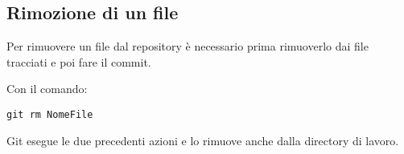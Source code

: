 \subsection{Rimozione di un file}
Per rimuovere un file dal repository è necessario prima rimuoverlo dai file tracciati e poi fare il commit.

Con il comando:

\begin{center}
\texttt{git rm NomeFile}
\end{center}

Git esegue le due precedenti azioni e lo rimuove anche dalla directory di lavoro.